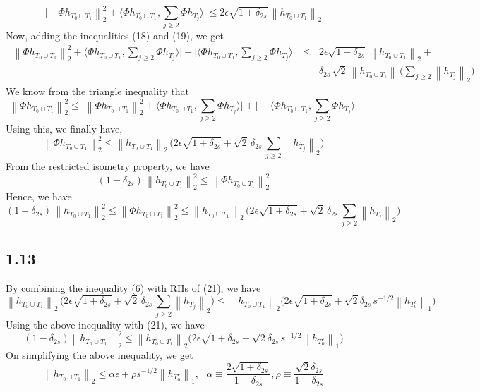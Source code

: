 \documentclass[12pt]{article}
\newcommand{\norm}[1]{\left\lVert #1 \right\rVert}
\begin{document}
\begin{equation}
	\bigg|\norm{\Phi h_{T_0 \cup T_1}}_2^2 + \bigg\langle \Phi h_{T_0 \cup T_1}, \sum_{j \geq 2} \Phi h_{T_j}\bigg\rangle \bigg| \leq 	2\epsilon \sqrt{1 + \delta_{2s}} \, \norm{ h_{T_0 \cup T_1}}_2
\end{equation}
Now, adding the inequalities (18) and (19), we get
\begin{eqnarray*}
\bigg|\norm{\Phi h_{T_0 \cup T_1}}_2^2 + \bigg\langle \Phi h_{T_0 \cup T_1}, \sum_{j \geq 2} \Phi h_{T_j}\bigg\rangle \bigg| + \bigg|\bigg\langle \Phi h_{T_0 \cup T_1}, \sum_{j \geq 2} \Phi h_{T_j}\bigg\rangle \bigg| &\leq& 	2\epsilon \sqrt{1 + \delta_{2s}} \, \norm{ h_{T_0 \cup T_1}}_2 + \\ 
&& \delta_{2s} \, \sqrt{2}\,\norm{h_{T_0 \cup T_1}} \, \bigg(\sum \limits_{j \geq 2} \norm{h_{T_j}}_2\bigg)
\end{eqnarray*}
We know from the triangle inequality that 
$$\norm{\Phi h_{T_0 \cup T_1}}_2^2 \leq \bigg|\norm{\Phi h_{T_0 \cup T_1}}_2^2 + \bigg\langle \Phi h_{T_0 \cup T_1}, \sum_{j \geq 2} \Phi h_{T_j}\bigg\rangle \bigg| + \bigg|- \bigg\langle \Phi h_{T_0 \cup T_1}, \sum_{j \geq 2} \Phi h_{T_j}\bigg\rangle \bigg|$$
Using this, we finally have,
\begin{equation}
\norm{\Phi h_{T_0 \cup T_1}}_2^2 \leq \norm{ h_{T_0 \cup T_1}}_2 \, \bigg(2\epsilon \sqrt{1 + \delta_{2s}} + \sqrt{2}\,\delta_{2s}\,\sum \limits_{j \geq 2} \norm{h_{T_j}}_2\bigg)
\end{equation}
From the restricted isometry property, we have
$$(1 - \delta_{2s})\, \norm{h_{T_0 \cup T_1}}_2^2 \leq \norm{\Phi h_{T_0 \cup T_1}}_2^2$$
Hence, we have
\begin{equation}
(1 - \delta_{2s})\, \norm{h_{T_0 \cup T_1}}_2^2 \leq \norm{\Phi h_{T_0 \cup T_1}}_2^2 \leq
\norm{ h_{T_0 \cup T_1}}_2 \, \bigg(2\epsilon \sqrt{1 + \delta_{2s}} + \sqrt{2}\,\delta_{2s}\,\sum \limits_{j \geq 2} \norm{h_{T_j}}_2\bigg) 
\end{equation}
\subsection*{1.13}
By combining the inequality (6) with RHs of (21), we have
$$\norm{ h_{T_0 \cup T_1}}_2 \, \bigg(2\epsilon \sqrt{1 + \delta_{2s}} + \sqrt{2}\,\delta_{2s}\,\sum \limits_{j \geq 2} \norm{h_{T_j}}_2\bigg) \leq \norm{h_{T_0 \cup T_1}}_2 \bigg(2\epsilon \sqrt{1 + \delta_{2s}} + \sqrt{2}\delta_{2s} \, s^{-1/2} \norm{h_{T_0^c}}_1\bigg)$$
Using the above inequality with (21), we have
$$(1 - \delta_{2s})\norm{h_{T_0 \cup T_1}}_2^2 \leq \norm{h_{T_0 \cup T_1}}_2 \bigg(2\epsilon \sqrt{1 + \delta_{2s}} + \sqrt{2}\delta_{2s} \, s^{-1/2} \norm{h_{T_0^c}}_1\bigg)$$
On simplifying the above inequality, we get
\begin{equation}
\norm{h_{T_0 \cup T_1}}_2 \leq \alpha \epsilon + \rho s^{-1/2} \norm{h_{T_0^c}}_1, \:\:\: \alpha \equiv \frac{2 \sqrt{1 + \delta_{2s}}}{1 - \delta_{2s}}, \rho \equiv \frac{\sqrt{2}\delta_{2s}}{1 - \delta_{2s}}
\end{equation}
\end{document}
